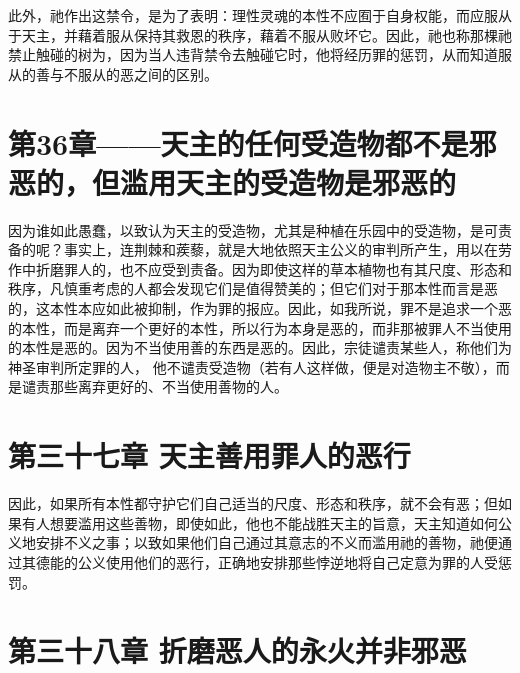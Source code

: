 此外，祂作出这禁令，是为了表明：理性灵魂的本性不应囿于自身权能，而应服从于天主，并藉着服从保持其救恩的秩序，藉着不服从败坏它。因此，祂也称那棵祂禁止触碰的树为，因为当人违背禁令去触碰它时，他将经历罪的惩罚，从而知道服从的善与不服从的恶之间的区别。\par


\section{第36章——天主的任何受造物都不是邪恶的，但滥用天主的受造物是邪恶的}

因为谁如此愚蠢，以致认为天主的受造物，尤其是种植在乐园中的受造物，是可责备的呢？事实上，连荆棘和蒺藜，就是大地依照天主公义的审判所产生，用以在劳作中折磨罪人的，也不应受到责备。因为即使这样的草本植物也有其尺度、形态和秩序，凡慎重考虑的人都会发现它们是值得赞美的；但它们对于那本性而言是恶的，这本性本应如此被抑制，作为罪的报应。因此，如我所说，罪不是追求一个恶的本性，而是离弃一个更好的本性，所以行为本身是恶的，而非那被罪人不当使用的本性是恶的。因为不当使用善的东西是恶的。因此，宗徒谴责某些人，称他们为神圣审判所定罪的人， 他不谴责受造物（若有人这样做，便是对造物主不敬），而是谴责那些离弃更好的、不当使用善物的人。\par


\section{第三十七章 天主善用罪人的恶行}

因此，如果所有本性都守护它们自己适当的尺度、形态和秩序，就不会有恶；但如果有人想要滥用这些善物，即使如此，他也不能战胜天主的旨意，天主知道如何公义地安排不义之事；以致如果他们自己通过其意志的不义而滥用祂的善物，祂便通过其德能的公义使用他们的恶行，正确地安排那些悖逆地将自己定意为罪的人受惩罚。\par


\section{第三十八章 折磨恶人的永火并非邪恶}

